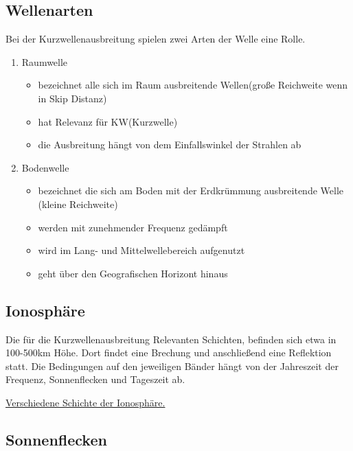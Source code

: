 \documentclass[fontzize=12pt,paper=a4,twoside=false]{article}
\begin{document}
\subsection[]{Wellenarten}
Bei der Kurzwellenausbreitung spielen zwei Arten der Welle eine Rolle.
\begin{enumerate}
    \item Raumwelle
    \begin{itemize}
        \item bezeichnet alle sich im Raum ausbreitende Wellen(große Reichweite wenn in Skip Distanz)
        \item hat Relevanz für KW(Kurzwelle)
        \item die Ausbreitung hängt von dem Einfallswinkel der Strahlen ab 
    \end{itemize}
    \item Bodenwelle
    \begin{itemize}
        \item bezeichnet die sich am Boden mit der Erdkrümmung ausbreitende Welle (kleine Reichweite)
        \item werden mit zunehmender Frequenz gedämpft
        \item wird im Lang- und Mittelwellebereich aufgenutzt
        \item geht über den Geografischen Horizont hinaus
    \end{itemize}
\end{enumerate}
\subsection[]{Ionosphäre}
Die für die Kurzwellenausbreitung Relevanten Schichten, befinden sich etwa in 100-500km Höhe.
Dort findet eine Brechung und anschließend eine Reflektion statt.
Die Bedingungen auf den jeweiligen Bänder hängt von der Jahreszeit der Frequenz, Sonnenflecken und Tageszeit ab. 


\href{https://www.darc.de/fileadmin/filemounts/referate/ajw/Onlinelehrgang/e09/Bild9-2.gif}{Verschiedene Schichte der Ionosphäre.}
\subsection[]{Sonnenflecken}
\end{document}
